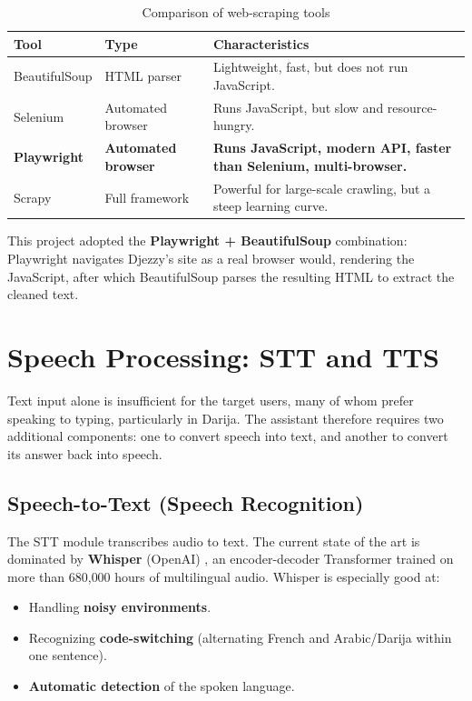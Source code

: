 \documentclass[12pt, a4paper]{report}
\newcommand{\sourced}[1]{#1}        %
\newcommand{\humantext}[1]{#1}      %
\begin{document}
\begin{table}[H]
\centering
\caption{Comparison of web-scraping tools}
\label{tab:scraping_tools}
\begin{tabularx}{\textwidth}{l l X}
\toprule
\textbf{Tool} & \textbf{Type} & \textbf{Characteristics} \\
\midrule
BeautifulSoup & HTML parser & Lightweight, fast, but does not run JavaScript. \\
Selenium & Automated browser & Runs JavaScript, but slow and resource-hungry. \\
\textbf{Playwright} & \textbf{Automated browser} & \textbf{Runs JavaScript, modern API, faster than Selenium, multi-browser.} \\
Scrapy & Full framework & Powerful for large-scale crawling, but a steep learning curve. \\
\bottomrule
\end{tabularx}
\end{table}

\humantext{This project adopted the \textbf{Playwright + BeautifulSoup} combination: Playwright navigates Djezzy's site as a real browser would, rendering the JavaScript, after which BeautifulSoup parses the resulting HTML to extract the cleaned text.}

\section{Speech Processing: STT and TTS}
\humantext{Text input alone is insufficient for the target users, many of whom prefer speaking to typing, particularly in Darija. The assistant therefore requires two additional components: one to convert speech into text, and another to convert its answer back into speech.}

\subsection{Speech-to-Text (Speech Recognition)}
\sourced{The STT module transcribes audio to text. The current state of the art is dominated by \textbf{Whisper} (OpenAI) \cite{radford2023whisper}, an encoder-decoder Transformer trained on more than 680{,}000 hours of multilingual audio. Whisper is especially good at:}
\begin{itemize}[noitemsep]
    \item \humantext{Handling \textbf{noisy environments}.}
    \item \humantext{Recognizing \textbf{code-switching} (alternating French and Arabic/Darija within one sentence).}
    \item \humantext{\textbf{Automatic detection} of the spoken language.}
\end{itemize}
\end{document}
